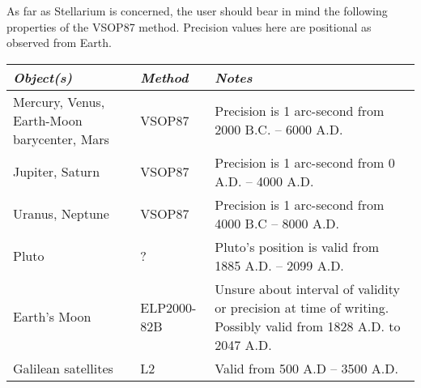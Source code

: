 As far as Stellarium is concerned, the user should bear in mind the
following properties of the VSOP87 method. Precision values here are
positional as observed from Earth.

\begin{longtabu} to \textwidth {X|l|X}
\toprule
\emph{Object(s)} & \emph{Method} & \emph{Notes}\tabularnewline
\midrule
Mercury, Venus, Earth-Moon barycenter, Mars & VSOP87 & Precision is 1
arc-second from 2000 B.C. -- 6000 A.D.\tabularnewline
\midrule
Jupiter, Saturn & VSOP87 & Precision is 1 arc-second from 0 A.D. -- 4000
A.D.\tabularnewline
\midrule
Uranus, Neptune & VSOP87 & Precision is 1 arc-second from 4000 B.C --
8000 A.D.\tabularnewline
\midrule
Pluto & ? & Pluto's position is valid from 1885 A.D. -- 2099
A.D.\tabularnewline
\midrule
Earth's Moon & ELP2000-82B & Unsure about interval of validity or
precision at time of writing. Possibly valid from 1828 A.D. to 2047
A.D.\tabularnewline
\midrule
Galilean satellites & L2 & Valid from 500 A.D -- 3500
A.D.\tabularnewline
\bottomrule
\end{longtabu}

